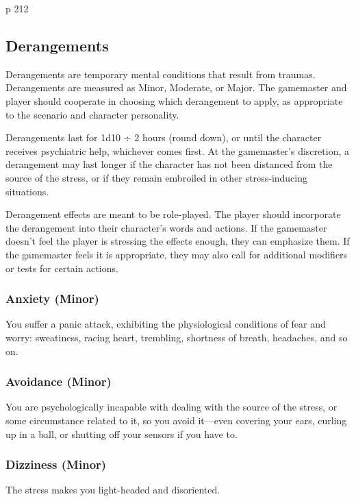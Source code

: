 p
212

\subsection{Derangements}

Derangements are temporary mental conditions that 
result from traumas. Derangements are measured as 
Minor, Moderate, or Major. The gamemaster and 
player should cooperate in choosing which derangement
to apply, as appropriate to the scenario and
character personality.

Derangements last for 1d10 ÷ 2 hours (round 
down), or until the character receives psychiatric help, 
whichever comes first. At the gamemaster's discretion, 
a derangement may last longer if the character has not 
been distanced from the source of the stress, or if they 
remain embroiled in other stress-inducing situations.

Derangement effects are meant to be role-played. 
The player should incorporate the derangement into 
their character's words and actions. If the gamemaster 
doesn't feel the player is stressing the effects enough, 
they can emphasize them. If the gamemaster feels it is 
appropriate, they may also call for additional modifiers
or tests for certain actions.

\subsubsection{Anxiety (Minor)}

You suffer a panic attack, exhibiting the physiological 
conditions of fear and worry: sweatiness, racing heart, 
trembling, shortness of breath, headaches, and so on.

\subsubsection{Avoidance (Minor)}

You are psychologically incapable with dealing with 
the source of the stress, or some circumstance related 
to it, so you avoid it—even covering your ears, curling
up in a ball, or shutting off your sensors if you
have to.

\subsubsection{Dizziness (Minor)}

The stress makes you light-headed and disoriented.

